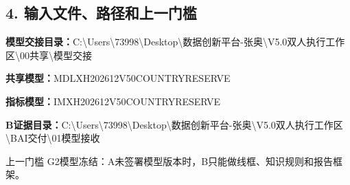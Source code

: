 \documentclass[UTF8,openany,zihao=-4]{ctexbook}
\renewcommand{\_}{\textunderscore\allowbreak}
\begin{document}
\subsection*{4. 输入文件、路径和上一门槛}
\noindent\textbf{模型交接目录：}{\promptlatin\promptcjk\small C:\textbackslash{}\allowbreak{}Users\textbackslash{}\allowbreak{}73998\textbackslash{}\allowbreak{}Desktop\textbackslash{}\allowbreak{}数据创新平台-\allowbreak{}张奥\textbackslash{}\allowbreak{}V5.0\_\allowbreak{}双人执行工作区\textbackslash{}\allowbreak{}00\_\allowbreak{}共享\textbackslash{}\allowbreak{}模型交接}\par
\noindent\textbf{共享模型：}{\promptlatin\promptcjk\small MDL\_\allowbreak{}XH202612\_\allowbreak{}V50\_\allowbreak{}COUNTRY\_\allowbreak{}RESERVE}\par
\noindent\textbf{指标模型：}{\promptlatin\promptcjk\small IM\_\allowbreak{}XH202612\_\allowbreak{}V50\_\allowbreak{}COUNTRY\_\allowbreak{}RESERVE}\par
\noindent\textbf{B证据目录：}{\promptlatin\promptcjk\small C:\textbackslash{}\allowbreak{}Users\textbackslash{}\allowbreak{}73998\textbackslash{}\allowbreak{}Desktop\textbackslash{}\allowbreak{}数据创新平台-\allowbreak{}张奥\textbackslash{}\allowbreak{}V5.0\_\allowbreak{}双人执行工作区\textbackslash{}\allowbreak{}B\_\allowbreak{}AI交付\textbackslash{}\allowbreak{}01\_\allowbreak{}模型接收}\par
\begin{gatebox}{上一门槛}
G2模型冻结：A未签署模型版本时，B只能做线框、知识规则和报告框架。

\end{gatebox}
\end{document}

